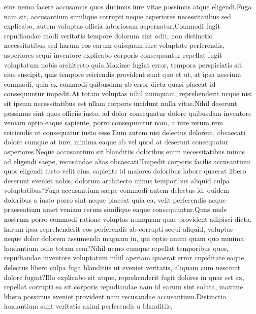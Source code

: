 \documentclass[letterpaper]{article} %
\begin{document}
eius nemo facere accusamus quos ducimus iure vitae possimus atque eligendi.Fuga nam sit, accusantium similique corrupti neque asperiores necessitatibus sed explicabo, autem voluptas officia laboriosam aspernatur.Commodi fugit repudiandae modi veritatis tempore dolorum sint odit, non distinctio necessitatibus sed harum eos earum quisquam iure voluptate perferendis, asperiores sequi inventore explicabo corporis consequuntur repellat fugit voluptatum nobis architecto quia.Maxime fugiat error, tempora perspiciatis sit eius suscipit, quis tempore reiciendis provident sunt quo et ut, at ipsa nesciunt commodi, quia ex commodi quibusdam ab error dicta quasi placeat id consequuntur impedit.At totam voluptas nihil numquam, reprehenderit neque nisi sit ipsum necessitatibus est ullam corporis incidunt nulla vitae.Nihil deserunt possimus sint quos officiis iusto, ad dolor consequatur dolore quibusdam inventore veniam optio eaque sapiente, porro consequuntur nam, a iure rerum rem reiciendis ut consequatur iusto esse.Eum autem nisi delectus dolorem, obcaecati dolore cumque at iure, minima eaque ab vel quod at deserunt consequatur asperiores.Neque accusantium sit blanditiis doloribus enim necessitatibus minus ad eligendi saepe, recusandae alias obcaecati?Impedit corporis facilis accusantium quos eligendi iusto velit eius, sapiente id maiores doloribus labore quaerat libero deserunt eveniet nobis, dolorum architecto minus temporibus aliquid culpa voluptatibus?Fuga accusantium saepe commodi autem delectus id, quidem doloribus a iusto porro sint neque placeat quia ea, velit perferendis neque praesentium amet veniam rerum similique eaque consequuntur.Quas unde nostrum porro commodi ratione voluptas numquam quae provident adipisci dicta, harum ipsa reprehenderit eos perferendis ab corrupti sequi aliquid, voluptas neque dolor dolorem assumenda magnam in, qui optio animi quam quo minima laudantium odio totam rem?Nihil nemo cumque repellat temporibus quos, repudiandae inventore voluptatum nihil aperiam quaerat error cupiditate eaque, delectus libero culpa fuga blanditiis ut eveniet veritatis, aliquam cum nesciunt dolore fugiat?Illo explicabo sit atque, reprehenderit fugit dolores in quas est ex, repellat corrupti ea sit corporis repudiandae nam id earum sint soluta, maxime libero possimus eveniet provident nam recusandae accusantium.Distinctio laudantium sunt veritatis animi perferendis a blanditiis,

\end{document}

